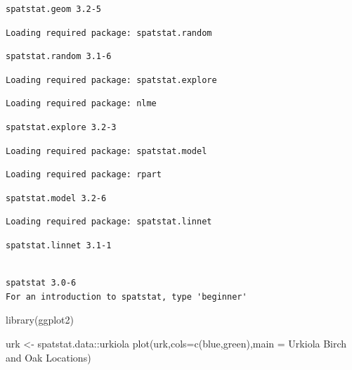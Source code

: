 \documentclass[
  letterpaper,
  DIV=11,
  numbers=noendperiod]{scrartcl}
\newenvironment{Shaded}{\begin{snugshade}}{\end{snugshade}}
\newcommand{\AttributeTok}[1]{\textcolor[rgb]{0.40,0.45,0.13}{#1}}
\newcommand{\FunctionTok}[1]{\textcolor[rgb]{0.28,0.35,0.67}{#1}}
\newcommand{\NormalTok}[1]{\textcolor[rgb]{0.00,0.23,0.31}{#1}}
\newcommand{\OtherTok}[1]{\textcolor[rgb]{0.00,0.23,0.31}{#1}}
\newcommand{\SpecialCharTok}[1]{\textcolor[rgb]{0.37,0.37,0.37}{#1}}
\newcommand{\StringTok}[1]{\textcolor[rgb]{0.13,0.47,0.30}{#1}}
\begin{document}
\begin{verbatim}
spatstat.geom 3.2-5
\end{verbatim}

\begin{verbatim}
Loading required package: spatstat.random
\end{verbatim}

\begin{verbatim}
spatstat.random 3.1-6
\end{verbatim}

\begin{verbatim}
Loading required package: spatstat.explore
\end{verbatim}

\begin{verbatim}
Loading required package: nlme
\end{verbatim}

\begin{verbatim}
spatstat.explore 3.2-3
\end{verbatim}

\begin{verbatim}
Loading required package: spatstat.model
\end{verbatim}

\begin{verbatim}
Loading required package: rpart
\end{verbatim}

\begin{verbatim}
spatstat.model 3.2-6
\end{verbatim}

\begin{verbatim}
Loading required package: spatstat.linnet
\end{verbatim}

\begin{verbatim}
spatstat.linnet 3.1-1
\end{verbatim}

\begin{verbatim}

spatstat 3.0-6 
For an introduction to spatstat, type 'beginner' 
\end{verbatim}

\begin{Shaded}
\begin{Highlighting}[]
\FunctionTok{library}\NormalTok{(ggplot2)}

\NormalTok{urk }\OtherTok{\textless{}{-}}\NormalTok{ spatstat.data}\SpecialCharTok{::}\NormalTok{urkiola}
\FunctionTok{plot}\NormalTok{(urk,}\AttributeTok{cols=}\FunctionTok{c}\NormalTok{(}\StringTok{\textquotesingle{}blue\textquotesingle{}}\NormalTok{,}\StringTok{\textquotesingle{}green\textquotesingle{}}\NormalTok{),}\AttributeTok{main =} \StringTok{\textquotesingle{}Urkiola Birch and Oak Locations\textquotesingle{}}\NormalTok{)}
\end{Highlighting}
\end{Shaded}
\end{document}
